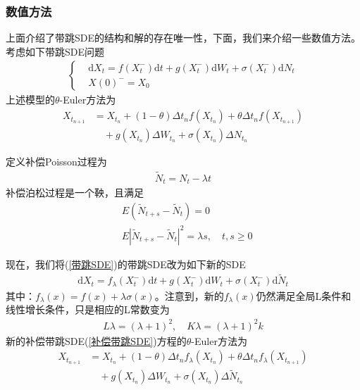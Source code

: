         \subsubsection{数值方法}
            \par
            上面介绍了带跳SDE的结构和解的存在唯一性，下面，我们来介绍一些数值方法。考虑如下带跳SDE问题
            \begin{align}
                \label{带跳SDE}
                \left\{
                    \begin{aligned}
                    &\mathrm{d}X_t = f(X_t^-)\mathrm{d}t + g(X_t^-)\mathrm{d}W_t + \sigma (X_t^-)\mathrm{d}N_t\\
                    &X(0)^- = X_0
                    \end{aligned}
                \right.
            \end{align}
            上述模型的$\theta$-Euler方法为
            \begin{align*}
                X_{t_{n+1}} &= X_{t_{n}} + (1-\theta)\Delta t_n f(X_{t_n}) + \theta \Delta t_n f(X_{t_{n+1}})\\
                &\quad +g(X_{t_n})\Delta W_{t_n} + \sigma (X_{t_n})\Delta N_{t_n}
            \end{align*}
            \par
            定义补偿Poisson过程为
            \begin{align*}
                \tilde{N}_t = N_t - \lambda t
            \end{align*}
            补偿泊松过程是一个鞅，且满足
            \begin{align*}
            &E(\tilde{N}_{t+s} - \tilde{N}_t) = 0\\
            &E|\tilde{N}_{t+s} - \tilde{N}_t|^2 = \lambda s,\quad t,s \geqslant 0
            \end{align*}
            \par
            现在，我们将(\ref{带跳SDE})的带跳SDE改为如下新的SDE
            \begin{align}
                \label{补偿带跳SDE}
                \mathrm{d}X_t = f_\lambda(X_t^-)\mathrm{d}t+g(X_t^-)\mathrm{d}W_t + \sigma (X_t^-)\mathrm{d}\tilde{N}_t
            \end{align}
            其中：$f_\lambda(x) = f(x) + \lambda\sigma(x) $。注意到，新的$f_\lambda(x)$仍然满足全局L条件和线性增长条件，只是相应的L常数变为
            \begin{align*}
                L\lambda = (\lambda+1)^2,\quad K\lambda = (\lambda+1)^2k
            \end{align*}
            新的补偿带跳SDE(\ref{补偿带跳SDE})方程的$\theta$-Euler方法为
            \begin{align*}
                X_{t_{n+1}} &= X_{t_{n}} + (1-\theta)\Delta t_n f_\lambda(X_{t_n}) + \theta \Delta t_n f_\lambda(X_{t_{n+1}})\\
                &\quad +g(X_{t_n})\Delta W_{t_n} + \sigma (X_{t_n})\Delta \tilde{N}_{t_n}
            \end{align*}
